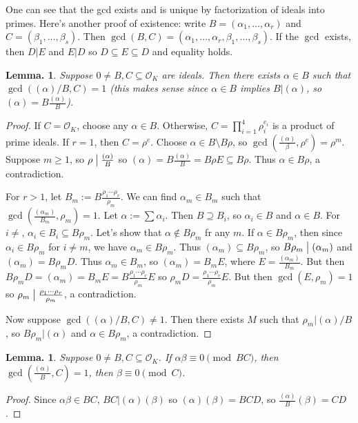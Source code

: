 \documentclass[11pt, a4paper]{memoir}
\renewcommand{\div}{\bigm|}
\theoremstyle{change}
\newtheorem{lemma}[theorem]{Lemma.}
\theoremstyle{plain}
\theoremstyle{nonumberplain}
\newtheorem{proof}{Proof}
\numberwithin{equation}{section}
\begin{document}
One can see that the gcd exists and is unique by factorization of ideals into primes.
Here's another proof of existence: write $B=(\alpha_1,\ldots,\alpha_r)$ and $C=(\beta_1,\ldots,\beta_s)$.
Then $\gcd(B,C)=(\alpha_1,\ldots,\alpha_r,\beta_1,\ldots,\beta_s)$.
If the $\gcd$ exists, then $D|E$ and $E|D$ so $D\subseteq E\subseteq D$ and equality holds.
\begin{lemma}
    Suppose $0\neq B,C\subseteq\mathcal{O}_K$ are ideals.
    Then there exists $\alpha\in B$ such that $\gcd((\alpha)/B,C)=1$ (this makes sense since $\alpha\in B$ implies $B|(\alpha)$, so $(\alpha)=B\frac{(\alpha)}{B}$).
\end{lemma}
\begin{proof}
    If $C=\mathcal{O}_K$, choose any $\alpha\in B$.
    Otherwise, $C=\prod_{i=1}^4\rho_i^{e_i}$ is a product of prime ideals.
    If $r=1$, then $C=\rho^e$.
    Choose $\alpha\in B\setminus B\rho$, so $\gcd\left(\frac{(\alpha)}{\beta},\rho^e\right)=\rho^m$.
    Suppose $m\geq 1$, so $\rho\div\frac{(\alpha)}{B}$ so $(\alpha)=B\frac{(\alpha)}{B}=B\rho E\subseteq B\rho$.
    Thus $\alpha\in B\rho$, a contradiction.

    For $r>1$, let $B_m:=B\frac{\rho_1\cdots\rho_r}{\rho_m}$.
    We can find $\alpha_m\in B_m$ such that $\gcd\left(\frac{(\alpha_m)}{B_m},\rho_m\right)=1$.
    Let $\alpha:=\sum\alpha_i$.
    Then $B\supseteq B_i$, so $\alpha_i\in B$ and $\alpha\in B$.
    For $i\neq $, $\alpha_i\in B_i\subseteq B\rho_m$.
    Let's show that $\alpha\notin B\rho_m$ fr any $m$.
    If $\alpha\in B\rho_m$, then since $\alpha_i\in B\rho_m$ for $i\neq m$, we have $\alpha_m\in B\rho_m$.
    Thus $(\alpha_m)\subseteq B\rho_m$, so $B\rho_m\div(\alpha_m)$ and $(\alpha_m)=B\rho_mD$.
    Thus $\alpha_m\in B_m$, so $(\alpha_m)=B_mE$, where $E=\frac{(\alpha_m)}{B_m}$.
    But then $B\rho_mD=(\alpha_m)=B_mE=B\frac{\rho_1\cdots\rho_r}{\rho_m}E$ so $\rho_mD=\frac{\rho_1\cdots\rho_r}{\rho_m}E$.
    But then $\gcd(E,\rho_m)=1$ so $\rho_m\div\frac{\rho_1\cdots\rho_r}{\rho_m}$, a contradiction.

    Now suppose $\gcd((\alpha)/B,C)\neq 1$.
    Then there exists $M$ such that $\rho_m|(\alpha)/B$, so $B\rho_m|(\alpha)$ and $\alpha\in B\rho_m$, a contradiction.
\end{proof}
\begin{lemma}
    Suppose $0\neq B,C\subseteq\mathcal{O}_K$.
    If $\alpha\beta\equiv 0\pmod{BC}$, then $\gcd\left(\frac{(\alpha)}{B},C\right)=1$, then $\beta\equiv 0\pmod{C}$.
\end{lemma}
\begin{proof}
    Since $\alpha\beta\in BC$, $BC|(\alpha)(\beta)$ so $(\alpha)(\beta)=BCD$, so $\frac{(\alpha)}{B}(\beta)=CD$.
\end{proof}
\end{document}
